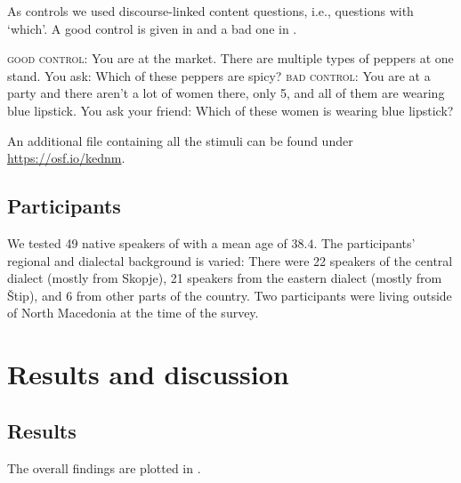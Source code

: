 \documentclass[output=paper,
colorlinks,
citecolor=brown,
newtxmath
]{langscibook}
\begin{document}
\begin{sloppypar}\noindent As controls we used discourse-linked content questions, i.e., questions with `which'. A good control is given in  and a bad one in .\end{sloppypar}


\eanoraggedright
\eanoraggedright \textsc{good control:} You are at the market. There are multiple types of peppers at one stand. You ask: Which of these peppers are spicy? \label{good}
\ex \textsc{bad control:} {You are at a party and there aren’t a lot of women there, only 5, and all of them are wearing blue lipstick. You ask your friend: Which of these women is wearing blue lipstick?} \label{bad}
\z\z

\noindent An additional file containing all the stimuli can be found under \url{https://osf.io/kednm}.


  \subsection{Participants}\label{sec:methodp}

We tested 49 native speakers of  with a mean age of $38.4$. The participants' regional and dialectal background is varied: There were 22 speakers of the central dialect (mostly from Skopje), 21 speakers from the eastern dialect (mostly from Štip), and 6 from other parts of the country. Two participants were living outside of North Macedonia at the time of the survey.


\section{Results and discussion}\label{sec:results}

\subsection{Results}
The overall findings are plotted in .
\end{document}
